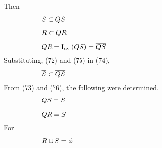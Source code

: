 \documentclass[10pt,journal]{IEEEtran}
\begin{document}
Then
\begin{equation}
 \begin{minipage}{250pt}
\begin{flushleft} $\displaystyle S \subset QS$  \end{flushleft}
 \end{minipage}
 \end{equation}
\begin{equation}
 \begin{minipage}{250pt}
\begin{flushleft} $\displaystyle R \subset QR$  \end{flushleft}
 \end{minipage}
 \end{equation}
\begin{equation}
 \begin{minipage}{250pt}
\begin{flushleft} $\displaystyle QR = \operatorname{I_{nv}}{\left(QS \right)} = \overline{QS}$  \end{flushleft}
 \end{minipage}
 \end{equation}
Substituting, (72) and (75) in (74), 
\begin{equation}
 \begin{minipage}{250pt}
\begin{flushleft} $\displaystyle \overline{S} \subset \overline{QS}$  \end{flushleft}
 \end{minipage}
 \end{equation}
From (73) and (76), the following were determined. 
\begin{equation}
 \begin{minipage}{250pt}
\begin{flushleft} $\displaystyle QS = S$  \end{flushleft}
 \end{minipage}
 \end{equation}
\begin{equation}
 \begin{minipage}{250pt}
\begin{flushleft} $\displaystyle QR = \overline{S}$  \end{flushleft}
 \end{minipage}
 \end{equation}
For 
\begin{equation}
 \begin{minipage}{250pt}
\begin{flushleft} $\displaystyle R \cup S = \phi$  \end{flushleft}
 \end{minipage}
 \end{equation}
\end{document}
